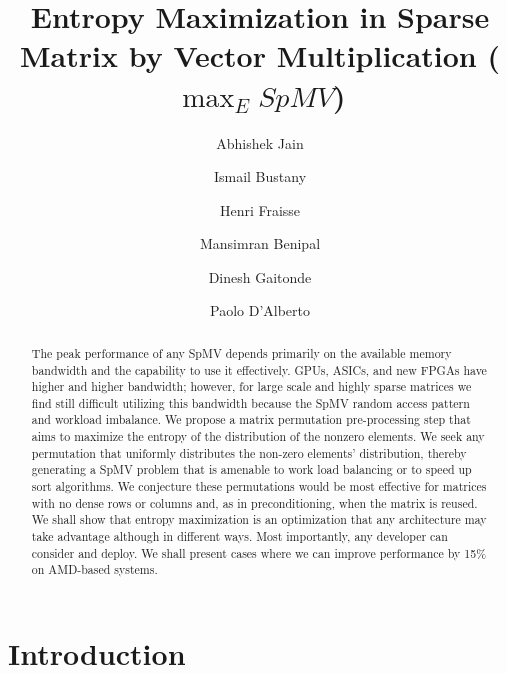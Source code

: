 \documentclass[manuscript,screen]{acmart}
\begin{document}
\title{Entropy Maximization in Sparse Matrix by Vector Multiplication ($\max_E SpMV$) }

\author{Abhishek Jain}
\author{Ismail Bustany}
\author{Henri Fraisse}
\author{Mansimran Benipal}
\author{Dinesh Gaitonde}
\author{Paolo D'Alberto}

\renewcommand{\shortauthors}{Jain et al.}

\begin{abstract}
The peak performance of any SpMV depends primarily on the available
memory bandwidth and the capability to use it effectively. GPUs,
ASICs, and new FPGAs have higher and higher bandwidth; however, for
large scale and highly sparse matrices we find still difficult
utilizing this bandwidth because the SpMV random access pattern and
workload imbalance.  We propose a matrix permutation pre-processing
step that aims to maximize the entropy of the distribution of the
nonzero elements.  We seek any permutation that uniformly distributes
the non-zero elements' distribution, thereby generating a SpMV problem
that is amenable to work load balancing or to speed up sort
algorithms.  We conjecture these permutations would be most effective
for matrices with no dense rows or columns and, as in preconditioning,
when the matrix is reused. We shall show that entropy maximization is
an optimization that any architecture may take advantage although in
different ways. Most importantly, any developer can consider and
deploy. We shall present cases where we can improve performance by
15\% on AMD-based systems.

\end{abstract}

\maketitle

\section{Introduction} 
\label{sec:introduction}
\end{document}
